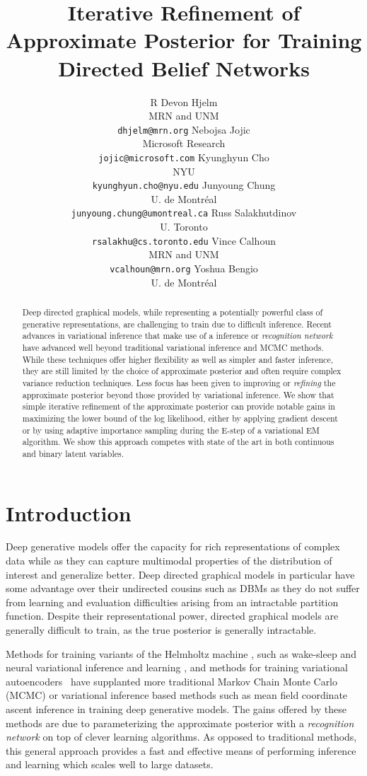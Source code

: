 \documentclass{article} %
\title{Iterative Refinement of Approximate Posterior for Training Directed Belief Networks}
\author{R Devon Hjelm \\
MRN and UNM \\
\texttt{dhjelm@mrn.org} 
\And
Nebojsa Jojic \\
Microsoft Research \\
\texttt{jojic@microsoft.com}
\And
Kyunghyun Cho \\
NYU \\
\texttt{kyunghyun.cho@nyu.edu}
\And
Junyoung Chung \\
U. de Montr\'{e}al \\
\texttt{junyoung.chung@umontreal.ca}
\And
Russ Salakhutdinov \\
U. Toronto \\
\texttt{rsalakhu@cs.toronto.edu}
\And
Vince Calhoun \\
MRN and UNM \\
\texttt{vcalhoun@mrn.org}
\And
Yoshua Bengio \\
U. de Montr\'{e}al
}
\begin{document}
\maketitle

\begin{abstract}
    Deep directed graphical models, while representing a potentially powerful
    class of generative representations, are challenging to train due to
    difficult inference. Recent advances in variational inference that make use
    of a inference or \emph{recognition network} have advanced well beyond
    traditional variational inference and MCMC methods. While these techniques
    offer higher flexibility as well as simpler and faster inference, they are
    still limited by the choice of approximate posterior and often require complex variance
    reduction techniques. Less focus has been given to improving or \emph{refining} the
    approximate posterior beyond those provided by variational inference. We
    show that simple iterative refinement of the approximate posterior can provide
    notable gains in maximizing the lower bound of the log likelihood, either
    by applying gradient descent or by using adaptive importance sampling
    during the E-step of a variational EM algorithm. We show this approach
    competes with state of the art in both continuous and binary latent
    variables.
    \end{abstract}

\section{Introduction}

Deep generative models offer the capacity for rich representations of complex
data while as they can capture multimodal properties of the distribution of
interest and generalize better. Deep directed
graphical models in particular have some advantage over their undirected
cousins such as DBMs \citep{salakhutdinov2009deep} as they do not suffer from
learning and evaluation difficulties arising from an intractable partition
function. Despite their representational power, directed graphical models are
generally difficult to train, as the true posterior is generally intractable.

Methods for training variants of the Helmholtz machine
\citep{dayan1995helmholtz}, such as wake-sleep \citep{hinton1995wake,
bornschein2014reweighted} and neural variational inference and learning
\citep[NVIL,][]{mnih2014neural}, and methods for training variational autoencoders~
\citep[VAE,][]{kingma2013auto} have supplanted more traditional Markov Chain Monte
Carlo (MCMC) or variational inference based methods such as mean field
coordinate ascent inference in training deep generative models. The gains
offered by these methods are due to parameterizing the approximate posterior
with a \emph{recognition network} on top of clever learning algorithms. As
opposed to traditional methods, this general approach provides a fast and
effective means of performing inference and learning which scales well to large
datasets.
\end{document}
